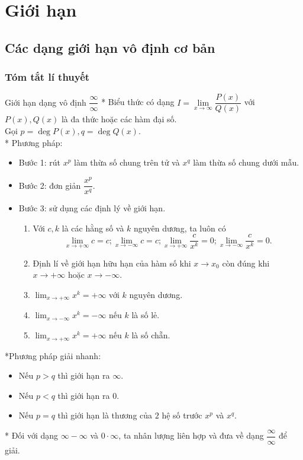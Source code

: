 \chapter{Giới hạn}
\section{Các dạng giới hạn vô định cơ bản}
\subsection{Tóm tắt lí thuyết}
\begin{dang}{Giới hạn dạng vô định $\dfrac{\infty }{\infty }$}
	* Biểu thức có dạng $I=\lim\limits_{x\to \infty}\dfrac{P(x)}{Q(x)}$ với $P(x),Q(x)$ là đa thức hoặc các hàm đại số.\\
	Gọi $p=\deg P(x),q=\deg Q(x)$.\\
	* Phương pháp:
	\begin{itemize}
		\item Bước 1: rút $x^p$ làm thừa số chung trên tử và $x^q$ làm thừa số chung dưới mẫu.
		\item Bước 2: đơn giản $\dfrac{x^p}{x^q}$.
		\item Bước 3: sử dụng các định lý về giới hạn.
		\begin{enumerate}
			\item	Với $c,k$ là các hằng số và $k$ nguyên dương, ta luôn có
			$$ \displaystyle \lim_{x \to + \infty}c = c; \displaystyle \lim_{x \to - \infty} c = c; \displaystyle \lim_{x \to + \infty} \dfrac{c}{x^k}= 0;\displaystyle \lim_{x \to - \infty} \dfrac{c}{x^k}= 0.$$
			\item	Định lí về giới hạn hữu hạn của hàm số khi $x \rightarrow x_0$ còn đúng khi $x \rightarrow +\infty$ hoặc $x \rightarrow -\infty$.
			\item	$\displaystyle \lim_{x \to +\infty} x^k = + \infty$ với $k$ nguyên dương.
			\item	$\displaystyle \lim_{x \to -\infty} x^k = - \infty$ nếu $k$ là số lẻ.
			\item 	$\displaystyle \lim_{x \to +\infty} x^k = + \infty$ nếu $k$ là số chẵn.
		\end{enumerate}
	\end{itemize}
	*Phương pháp giải nhanh:
	\begin{itemize}
		\item Nếu $p> q$ thì giới hạn ra $\infty$.
		\item Nếu $p<q$ thì giới hạn ra $0$.
		\item Nếu $p=q$ thì giới hạn là thương của $2$ hệ số trước $x^p$ và $x^q$.
	\end{itemize}
	* Đối với dạng $\infty -\infty$ và $0\cdot\infty$, ta nhân lượng liên hợp và đưa về dạng $\dfrac{\infty }{\infty }$ để giải.
\end{dang}

